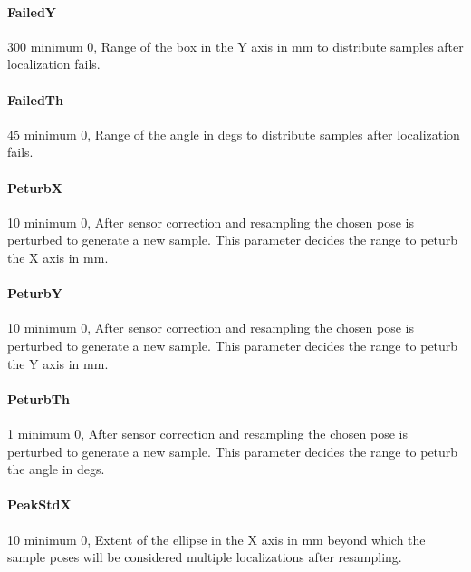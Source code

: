 \documentclass{article}
\begin{document}
\paragraph{FailedY} 300               minimum 0,  Range of the box in the Y axis in mm to
                          distribute samples after localization fails.

\paragraph{FailedTh} 45               minimum 0,  Range of the angle in degs to distribute
                          samples after localization fails.

\paragraph{PeturbX}\label{PeturbX} 10                minimum 0,  After sensor correction and resampling
                          the chosen pose is perturbed to generate a new
                          sample. This parameter decides the range to peturb
                          the X axis in mm.

\paragraph{PeturbY}\label{PeturbY} 10                minimum 0,  After sensor correction and resampling
                          the chosen pose is perturbed to generate a new
                          sample. This parameter decides the range to peturb
                          the Y axis in mm.

\paragraph{PeturbTh}\label{PeturbTh} 1                minimum 0,  After sensor correction and resampling
                          the chosen pose is perturbed to generate a new
                          sample. This parameter decides the range to peturb
                          the angle in degs.

\paragraph{PeakStdX} 10               minimum 0,  Extent of the ellipse in the X axis in
                          mm beyond which the sample poses will be considered
                          multiple localizations after resampling.
\end{document}
